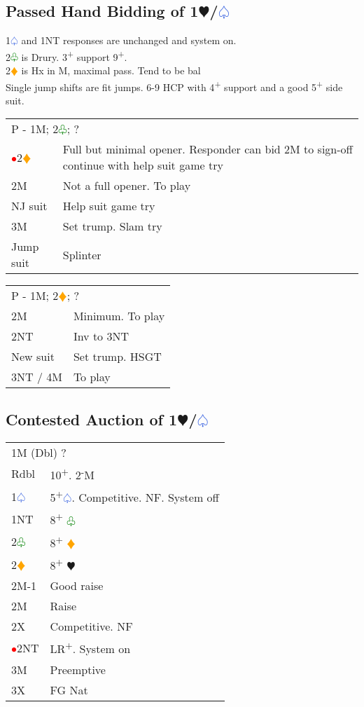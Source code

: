 \documentclass{article}
\renewcommand{\sp}{\textcolor{RoyalBlue}{$\varspade$}}
\newcommand{\he}{\textcolor{RubineRed}{$\varheart$}}
\newcommand{\di}{\textcolor{Orange}{$\vardiamond$}}
\newcommand{\cl}{\textcolor{Green}{$\varclub$}}
\newcommand{\nt}{\relsize{-1}NT\relsize{1}}
\newcommand{\up}{\textsuperscript{+}}
\newcommand{\down}{\textsuperscript{-}}
\newcommand{\al}{\textcolor{red}{$\bullet$}}
\begin{document}
\subsection{Passed Hand Bidding of 1\he{}/\sp}
1\sp{} and 1\nt{} responses are unchanged and system on. \\

2\cl{} is Drury. 3\up{} support 9\up{}. \\
2\di{} is Hx in M, maximal pass. Tend to be bal \\

Single jump shifts are fit jumps. 6-9 HCP with 4\up{} support and a good 5\up{} side suit. \\

\begin{tabular}{|l|p{6.5cm}}
	\multicolumn{2}{l}{P - 1M; 2\cl{}; ?}\\
	\al{}2\di{} & Full but minimal opener. Responder can bid 2M to sign-off continue with help suit game try \\
	2M & Not a full opener. To play \\
	NJ suit & Help suit game try \\
	3M & Set trump. Slam try \\
	Jump suit & Splinter \\
\end{tabular}

\medskip

\begin{tabular}{|l|p{6.5cm}}
	\multicolumn{2}{l}{P - 1M; 2\di{}; ?}\\
	2M & Minimum. To play \\
	2\nt{} & Inv to 3\nt{} \\
	New suit & Set trump. HSGT \\
	3\nt{} / 4M & To play \\
\end{tabular}

\subsection{Contested Auction of 1\he/\sp{}}

\begin{tabular}{|l|p{6.5cm}}
	\multicolumn{2}{l}{1M (Dbl) ?} \\
	Rdbl & 10\up. 2\down{}M \\
	1\sp{} & 5\up{}\sp{}. Competitive. NF. System off \\
	1\nt{} & 8\up{} \cl{} \\
	2\cl{} & 8\up{} \di{} \\
	2\di{} & 8\up{} \he{} \\
	2M-1 & Good raise \\
	2M & Raise \\
	2X & Competitive. NF \\
	\al{}2\nt & LR\up{}. System on \\
	3M & Preemptive \\
	3X & FG Nat \\
\end{tabular}
\end{document}
